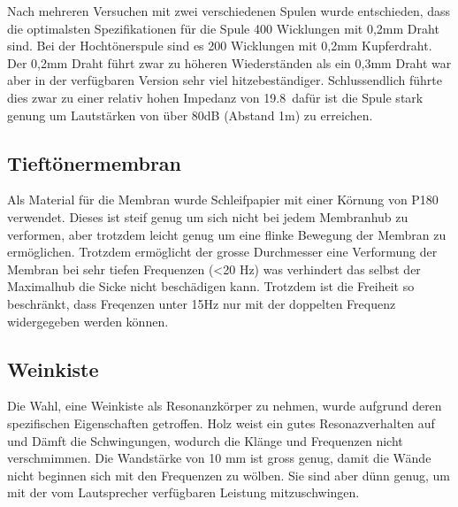 \documentclass[a4paper,11pt]{report}
\begin{document}
Nach mehreren Versuchen mit zwei verschiedenen Spulen wurde entschieden, dass die optimalsten Spezifikationen für die Spule 400 Wicklungen mit 0,2mm Draht sind. Bei der Hochtönerspule sind es 200 Wicklungen mit 0,2mm Kupferdraht. Der 0,2mm Draht führt zwar zu höheren Wiederständen als ein 0,3mm Draht war aber in der verfügbaren Version sehr viel hitzebeständiger. Schlussendlich führte dies zwar zu einer relativ hohen Impedanz von 19.8\Omega\ dafür ist die Spule stark genung um Lautstärken von über 80dB (Abstand 1m) zu erreichen. 

\subsection{Tieftönermembran}
Als Material für die Membran wurde Schleifpapier mit einer Körnung von P180 verwendet. Dieses ist steif genug um sich nicht bei jedem Membranhub zu verformen, aber trotzdem leicht genug um eine flinke Bewegung der Membran zu ermöglichen. Trotzdem ermöglicht der grosse Durchmesser eine Verformung der Membran bei sehr tiefen Frequenzen (<20 Hz) was verhindert das selbst der Maximalhub die Sicke nicht beschädigen kann. Trotzdem ist die Freiheit so beschränkt, dass Freqenzen unter 15Hz nur mit der doppelten Frequenz widergegeben werden können. 

\subsection{Weinkiste}
Die Wahl, eine Weinkiste als Resonanzkörper zu nehmen, wurde aufgrund deren spezifischen Eigenschaften getroffen. Holz weist ein gutes Resonazverhalten auf und Dämft die Schwingungen, wodurch die Klänge und Frequenzen nicht verschmimmen. Die Wandstärke von 10 mm ist gross genug, damit die Wände nicht beginnen sich mit den Frequenzen zu wölben. Sie sind aber dünn genug, um mit der vom Lautsprecher verfügbaren Leistung mitzuschwingen. 
\end{document}

